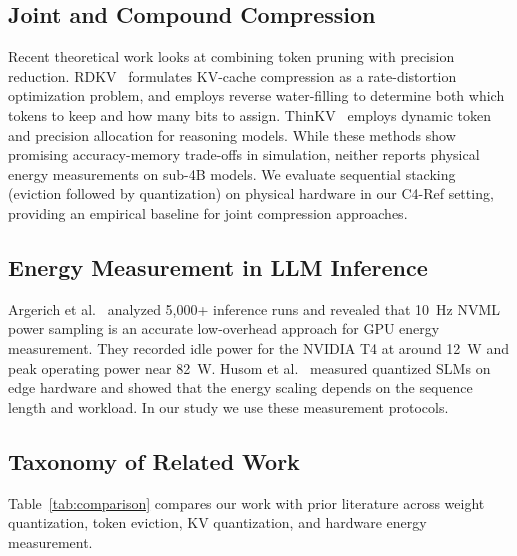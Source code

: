 \documentclass[sigconf,nonacm]{acmart}
\begin{document}
\subsection{Joint and Compound Compression}
Recent theoretical work looks at combining token pruning with precision reduction. RDKV~\cite{zhang_rdkv_2026} formulates KV-cache compression as a rate-distortion optimization problem, and employs reverse water-filling to determine both which tokens to keep and how many bits to assign. ThinKV~\cite{ramachandran_thinkv_2026} employs dynamic token and precision allocation for reasoning models. While these methods show promising accuracy-memory trade-offs in simulation, neither reports physical energy measurements on sub-4B models. We evaluate sequential stacking (eviction followed by quantization) on physical hardware in our C4-Ref setting, providing an empirical baseline for joint compression approaches.

\subsection{Energy Measurement in LLM Inference}
Argerich et al.~\cite{argerich_watt_2026} analyzed 5,000+ inference runs and revealed that 10~Hz NVML power sampling is an accurate low-overhead approach for GPU energy measurement. They recorded idle power for the NVIDIA T4 at around 12~W and peak operating power near 82~W. Husom et al.~\cite{husom_sustainable_2025} measured quantized SLMs on edge hardware and showed that the energy scaling depends on the sequence length and workload. In our study we use these measurement protocols.

\subsection{Taxonomy of Related Work}

Table~\ref{tab:comparison} compares our work with prior literature across weight quantization, token eviction, KV quantization, and hardware energy measurement.
\end{document}
